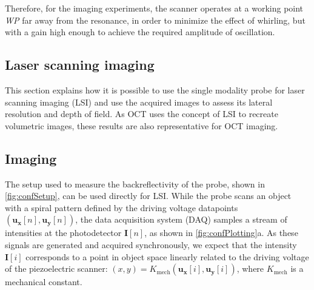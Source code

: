 \documentclass[10pt]{iopart}
\begin{document}
Therefore, for the imaging experiments, the scanner operates at a working point \textit{WP} far away from the resonance, in order to minimize the effect of whirling, but with a gain high enough to achieve the required amplitude of oscillation.


\subsection{Laser scanning imaging}
This section explains how it is possible to use the single modality probe for laser scanning imaging (LSI) and use the acquired images to assess its lateral resolution and depth of field. As OCT uses the concept of LSI to recreate volumetric images, these results are also representative for OCT imaging.

\subsection{Imaging}
The setup used to measure the backreflectivity of the probe, shown in \autoref{fig:confSetup}, can be used directly for LSI. While the probe scans an object with a spiral pattern defined by the driving voltage datapoints $(\mathbf{u_x}[n], \mathbf{u_y}[n])$, the data acquisition system (DAQ) samples a stream of intensities at the photodetector $\mathbf{I}[n]$, as shown in \autoref{fig:confPlotting}a. As these signals are generated and acquired synchronously, we expect that the intensity $\mathbf{I}[i]$ corresponds to a point in object space linearly related to the driving voltage of the piezoelectric scanner: $(x, y) = K_\mathrm{mech}(\mathbf{u_x}[i], \mathbf{u_y}[i])$, where $K_\mathrm{mech}$ is a mechanical constant.
\end{document}
